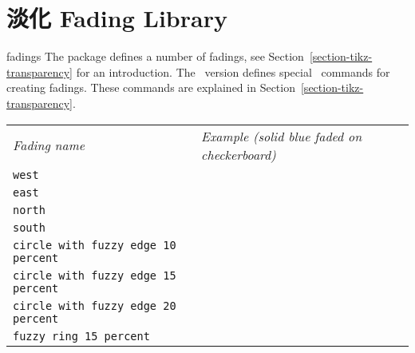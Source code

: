 %
%
%


\section{淡化 Fading Library}
\label{section-library-fadings}

\begin{pgflibrary}{fadings}
    The package defines a number of fadings, see
    Section~\ref{section-tikz-transparency} for an introduction.  The
    \tikzname\ version defines special \tikzname\ commands for creating
    fadings. These commands are explained in
    Section~\ref{section-tikz-transparency}.
\end{pgflibrary}

\newcommand\fadingindex[1]{%
  \index{#1@\protect\texttt{#1} fading}%
  \index{Fadings!#1@\protect\texttt{#1}}%
  \texttt{#1}&
  \begin{tikzpicture}[baseline=5mm-.5ex]
    \fill [black!20] (0,0) rectangle (1,1);
    \path [pattern=checkerboard,pattern color=black!30] (0,0) rectangle (1,1);

    \fill [path fading=#1,blue] (0,0) rectangle (1,1);
  \end{tikzpicture} \\[4.5mm]
}

\noindent
\begin{tabular}{ll}
    \emph{Fading name} & \emph{Example (solid blue faded on checkerboard)} \\[1mm]
    \fadingindex{west}
    \fadingindex{east}
    \fadingindex{north}
    \fadingindex{south}
    \fadingindex{circle with fuzzy edge 10 percent}
    \fadingindex{circle with fuzzy edge 15 percent}
    \fadingindex{circle with fuzzy edge 20 percent}
    \fadingindex{fuzzy ring 15 percent}
\end{tabular}


